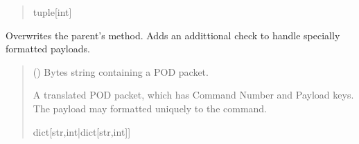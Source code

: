 \documentclass[letterpaper,10pt,english]{sphinxmanual}
\begin{document}
\begin{fulllineitems}
\begin{fulllineitems}
\begin{quote}
\begin{description}
\sphinxAtStartPar
tuple{[}int{]}

\end{description}\end{quote}

\end{fulllineitems}


\begin{fulllineitems}
\label{\detokenize{PodDevice_8229:PodDevice_8229.POD_8229.TranslatePODpacket}}
\pysigstartsignatures
{}
\pysigstopsignatures
\sphinxAtStartPar
Overwrites the parent’s method. Adds an addittional check to handle specially formatted         payloads.
\begin{quote}\begin{description}
\sphinxAtStartPar
{} () \textendash{} Bytes string containing a POD packet.

\sphinxAtStartPar
A translated POD packet, which has Command Number and Payload                 keys. The payload may formatted uniquely to the command.

\sphinxAtStartPar
dict{[}str,int|dict{[}str,int{]}{]}

\end{description}\end{quote}

\end{fulllineitems}



\end{fulllineitems}
\end{document}

